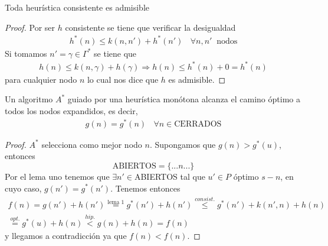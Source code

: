 \begin{teo}
    Toda heurística consistente es admisible
    \begin{proof}
        Por ser $h$ consistente se tiene que verificar la desigualdad
        \begin{gather*}
            h^*(n) \leq k(n,n') + h^*(n') \ \ \ \ \forall n,n' \ \text{ nodos}
        \end{gather*}
        Si tomamos $n'=\gamma \in \Gamma^*$ se tiene que 
        \begin{gather*}
            h(n) \leq k(n,\gamma) + h(\gamma) \Rightarrow h(n) \leq h^*(n) + 0 = h^*(n)
        \end{gather*}
        para cualquier nodo $n$ lo cual nos dice que $h$ es admisible.
    \end{proof}
\end{teo}

\begin{teo}
    Un algoritmo $A^*$ guiado por una heurística monótona alcanza el camino óptimo a todos los nodos expandidos, es decir, 
    \begin{gather*}
        g(n) = g^*(n)\ \ \ \ \forall n \in \text{CERRADOS}
    \end{gather*}
    \begin{proof}
        $A^*$ selecciona como mejor nodo $n$. Supongamos que $g(n)>g^*(u)$, entonces 
        \begin{equation*}
            \text{ABIERTOS} = \{... n ...\}
        \end{equation*}
        Por el lema uno tenemos que $\exists n'\in$ABIERTOS tal que $u'\in P$ óptimo $s-n$, en cuyo caso, $g(n')=g^*(n')$. Tenemos entonces
        \begin{gather*}
            f(n) = g(n') + h(n') \overset{\text{lema 1}}{=} g^*(n') + h(n') \overset{consist.}{\leq} g^*(n') + k(n',n) + h(n) \\
            \overset{opt.}{=} g^*(u)+h(n) \overset{hip.}{<} g(n)+h(n)=f(n)
        \end{gather*}
        y llegamos a contradicción ya que $f(n)<f(n)$.
    \end{proof}
\end{teo}
